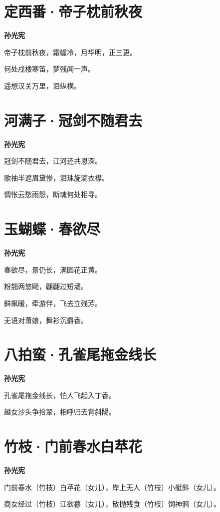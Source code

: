 \documentclass[12pt,a4paper]{ctexbook}
\begin{document}
\section{定西番·帝子枕前秋夜}
\textbf{孙光宪}\par\vspace{0.5em}
帝子枕前秋夜，霜幄冷，月华明，正三更。\par
何处戍楼寒笛，梦残闻一声。\par
遥想汉关万里，泪纵横。\par

\section{河满子·冠剑不随君去}
\textbf{孙光宪}\par\vspace{0.5em}
冠剑不随君去，江河还共恩深。\par
歌袖半遮眉黛惨，泪珠旋滴衣襟。\par
惆怅云愁雨怨，断魂何处相寻。\par

\section{玉蝴蝶·春欲尽}
\textbf{孙光宪}\par\vspace{0.5em}
春欲尽，景仍长，满园花正黄。\par
粉翘两悠飏，翩翩过短墙。\par
鲜飙暖，牵游伴，飞去立残芳。\par
无语对萧娘，舞衫沉麝香。\par

\section{八拍蛮·孔雀尾拖金线长}
\textbf{孙光宪}\par\vspace{0.5em}
孔雀尾拖金线长，怕人飞起入丁香。\par
越女沙头争拾翠，相呼归去背斜陽。\par

\section{竹枝·门前春水白苹花}
\textbf{孙光宪}\par\vspace{0.5em}
门前春水（竹枝）白苹花（女儿），岸上无人（竹枝）小艇斜（女儿）。\par
商女经过（竹枝）江欲暮（女儿），散抛残食（竹枝）饲神鸦（女儿）。\par
\end{document}
